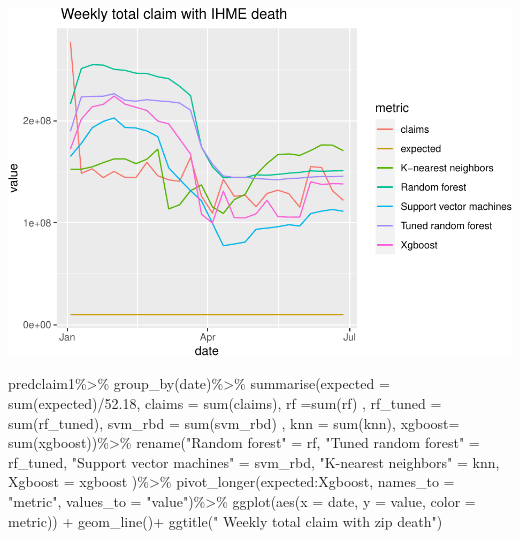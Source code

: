 \documentclass[
]{article}
\newenvironment{Shaded}{\begin{snugshade}}{\end{snugshade}}
\newcommand{\AttributeTok}[1]{\textcolor[rgb]{0.77,0.63,0.00}{#1}}
\newcommand{\FloatTok}[1]{\textcolor[rgb]{0.00,0.00,0.81}{#1}}
\newcommand{\FunctionTok}[1]{\textcolor[rgb]{0.00,0.00,0.00}{#1}}
\newcommand{\NormalTok}[1]{#1}
\newcommand{\OtherTok}[1]{\textcolor[rgb]{0.56,0.35,0.01}{#1}}
\newcommand{\SpecialCharTok}[1]{\textcolor[rgb]{0.00,0.00,0.00}{#1}}
\newcommand{\StringTok}[1]{\textcolor[rgb]{0.31,0.60,0.02}{#1}}
\begin{document}
\includegraphics{figures/report/fig-unnamed-chunk-86-1.pdf}

\begin{Shaded}
\begin{Highlighting}[]
\NormalTok{predclaim1}\SpecialCharTok{\%\textgreater{}\%}
  \FunctionTok{group\_by}\NormalTok{(date)}\SpecialCharTok{\%\textgreater{}\%}
  \FunctionTok{summarise}\NormalTok{(}\AttributeTok{expected =} \FunctionTok{sum}\NormalTok{(expected)}\SpecialCharTok{/}\FloatTok{52.18}\NormalTok{,}
        \AttributeTok{claims =} \FunctionTok{sum}\NormalTok{(claims),}
          \AttributeTok{rf =}\FunctionTok{sum}\NormalTok{(rf) ,}
         \AttributeTok{rf\_tuned =} \FunctionTok{sum}\NormalTok{(rf\_tuned),}
         \AttributeTok{svm\_rbd =} \FunctionTok{sum}\NormalTok{(svm\_rbd) ,}
         \AttributeTok{knn =} \FunctionTok{sum}\NormalTok{(knn),}
         \AttributeTok{xgboost=} \FunctionTok{sum}\NormalTok{(xgboost))}\SpecialCharTok{\%\textgreater{}\%}
   \FunctionTok{rename}\NormalTok{(}\StringTok{"Random forest"} \OtherTok{=}\NormalTok{ rf, }\StringTok{"Tuned random forest"} \OtherTok{=}\NormalTok{ rf\_tuned, }
    \StringTok{"Support vector machines"} \OtherTok{=}\NormalTok{ svm\_rbd, }\StringTok{"K{-}nearest neighbors"} \OtherTok{=}\NormalTok{ knn, }\AttributeTok{Xgboost =}\NormalTok{ xgboost )}\SpecialCharTok{\%\textgreater{}\%}
  \FunctionTok{pivot\_longer}\NormalTok{(expected}\SpecialCharTok{:}\NormalTok{Xgboost, }\AttributeTok{names\_to =} \StringTok{"metric"}\NormalTok{, }\AttributeTok{values\_to =} \StringTok{"value"}\NormalTok{)}\SpecialCharTok{\%\textgreater{}\%}
  \FunctionTok{ggplot}\NormalTok{(}\FunctionTok{aes}\NormalTok{(}\AttributeTok{x =}\NormalTok{ date, }\AttributeTok{y =}\NormalTok{ value, }\AttributeTok{color =}\NormalTok{ metric)) }\SpecialCharTok{+} \FunctionTok{geom\_line}\NormalTok{()}\SpecialCharTok{+}
  \FunctionTok{ggtitle}\NormalTok{(}\StringTok{" Weekly total claim with zip death"}\NormalTok{)}
\end{Highlighting}
\end{Shaded}
\end{document}
